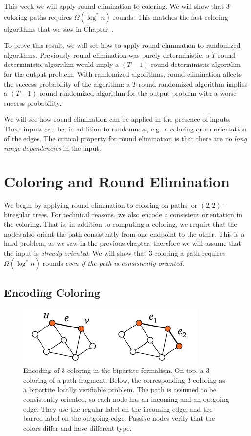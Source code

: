

\noindent
This week we will apply round elimination to coloring. We will show that 3-coloring paths requires $\Omega(\log^* n)$ rounds. This matches the fast coloring algorithms that we saw in Chapter~.

To prove this result, we will see how to apply round elimination to randomized algorithms. Previously round elimination was purely deterministic: a $T$-round deterministic algorithm would imply a $(T-1)$-round deterministic algorithm for the output problem. With randomized algorithms, round elimination affects the success probability of the algorithm: a $T$-round randomized algorithm implies a $(T-1)$-round randomized algorithm for the output problem with a worse success probability.

We will see how round elimination can be applied in the presence of inputs. These inputs can be, in addition to randomness, e.g.\ a coloring or an orientation of the edges. The critical property for round elimination is that there are no \emph{long range dependencies} in the input.

\section{Coloring and Round Elimination}

We begin by applying round elimination to coloring on paths, or $(2,2)$-biregular trees. For technical reasons, we also encode a consistent orientation in the coloring. That is, in addition to computing a coloring, we require that the nodes also orient the path consistently from one endpoint to the other. This is a hard problem, as we saw in the previous chapter; therefore we will assume that the input is \emph{already oriented}. We will show that $3$-coloring a path requires $\Omega(\log^* n)$ rounds \emph{even if the path is consistently oriented}.

\subsection{Encoding Coloring}

\begin{figure}
	\centering
	\includegraphics[page=\PEncodingThreeColoring,scale=0.4]{figs.pdf}
	\caption{Encoding of 3-coloring in the bipartite formalism. On top, a 3-coloring of a path fragment. Below, the corresponding 3-coloring as a bipartite locally verifiable problem. The path is assumed to be consistently oriented, so each node has an incoming and an outgoing edge. They use the regular label on the incoming edge, and the barred label on the outgoing edge. Passive nodes verify that the colors differ and have different type.} \label{fig:3col-encoding}
\end{figure}

